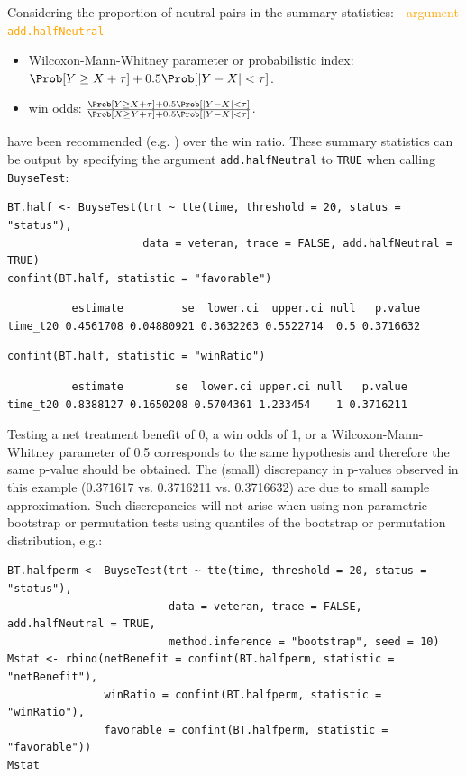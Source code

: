 \documentclass[12pt]{article}
\begin{document}
\noindent Considering the proportion of neutral pairs in the summary
statistics: \hfill \textcolor{orange}{- argument \texttt{add.halfNeutral}}
\begin{itemize}
\item Wilcoxon-Mann-Whitney parameter or probabilistic index: \(\Prob[Y\geq X + \tau] + 0.5 \Prob[|Y- X| < \tau]\).
\item win odds: \(\frac{\Prob[Y\geq X + \tau] + 0.5 \Prob[|Y- X| < \tau]}{\Prob[X\geq Y + \tau] + 0.5 \Prob[|Y- X| < \tau]}\).
\end{itemize}
have been recommended (e.g. \cite{ajufo2023fallacies}) over the win
ratio. These summary statistics can be output by specifying the
argument \texttt{add.halfNeutral} to \texttt{TRUE} when calling \texttt{BuyseTest}:
\lstset{language=r,label= ,caption= ,captionpos=b,numbers=none}
\begin{lstlisting}
BT.half <- BuyseTest(trt ~ tte(time, threshold = 20, status = "status"),
                     data = veteran, trace = FALSE, add.halfNeutral = TRUE)
confint(BT.half, statistic = "favorable")
\end{lstlisting}

\begin{verbatim}
          estimate         se  lower.ci  upper.ci null   p.value
time_t20 0.4561708 0.04880921 0.3632263 0.5522714  0.5 0.3716632
\end{verbatim}


\lstset{language=r,label= ,caption= ,captionpos=b,numbers=none}
\begin{lstlisting}
confint(BT.half, statistic = "winRatio")
\end{lstlisting}

\begin{verbatim}
          estimate        se  lower.ci upper.ci null   p.value
time_t20 0.8388127 0.1650208 0.5704361 1.233454    1 0.3716211
\end{verbatim}


Testing a net treatment benefit of 0, a win odds of 1, or a
 Wilcoxon-Mann-Whitney parameter of 0.5 corresponds to the same
 hypothesis and therefore the same p-value should be obtained. The
 (small) discrepancy in p-values observed in this example (0.371617
 vs. 0.3716211 vs. 0.3716632) are due to small sample
 approximation. Such discrepancies will not arise when using
 non-parametric bootstrap or permutation tests using quantiles of the
 bootstrap or permutation distribution, e.g.:
\lstset{language=r,label= ,caption= ,captionpos=b,numbers=none}
\begin{lstlisting}
BT.halfperm <- BuyseTest(trt ~ tte(time, threshold = 20, status = "status"),
                         data = veteran, trace = FALSE, add.halfNeutral = TRUE,
                         method.inference = "bootstrap", seed = 10)
Mstat <- rbind(netBenefit = confint(BT.halfperm, statistic = "netBenefit"),
               winRatio = confint(BT.halfperm, statistic = "winRatio"),
               favorable = confint(BT.halfperm, statistic = "favorable"))
Mstat
\end{lstlisting}
\end{document}

